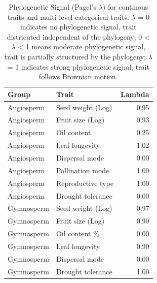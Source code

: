\documentclass{article}
\begin{document}
\begin{enumerate}
\begin{table}[ht]
\begin{tabular}{llr}
  \hline
Group & Trait & Lambda \\ 
  \hline
Angiosperm & Seed weight (Log) & 0.95 \\ 
  Angiosperm & Fruit size (Log) & 0.93 \\ 
  Angiosperm & Oil content & 0.25 \\ 
  Angiosperm & Leaf longevity & 1.02 \\ 
  Angiosperm & Dispersal mode & 0.00 \\ 
  Angiosperm & Pollination mode & 1.00 \\ 
  Angiosperm & Reproductive type & 1.00 \\ 
  Angiosperm & Drought tolerance & 0.00 \\ 
  Gymnosperm & Seed weight (Log) & 0.97 \\ 
  Gymnosperm & Fruit size (Log) & 0.90 \\ 
  Gymnosperm & Oil content \% & 0.00 \\ 
  Gymnosperm & Leaf longevity & 0.90 \\ 
  Gymnosperm & Dispersal mode & 0.00 \\ 
  Gymnosperm & Drought tolerance & 1.00 \\ 
   \hline
\end{tabular}
\caption{Phylogenetic Signal (Pagel's $\lambda$) for continous traits and multi-level categorical traits. $\lambda$ = 0 indicates no phylogenetic signal, trait districuted independent of the phylogeny; 0 < $\lambda$ < 1 means moderate phylogenetic signal, trait is partially structured by the phylogeny; $\lambda$ = 1 indicates strong phylogenetic signal, trait follows Brownian motion.}
\label{tab:lambda}
\end{table}


\end{enumerate}
\end{document}
